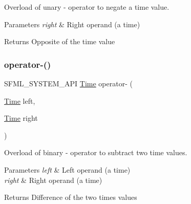 Overload of unary -\/ operator to negate a time value. 


\begin{DoxyParams}{Parameters}
{\em right} & Right operand (a time)\\
\hline
\end{DoxyParams}
\begin{DoxyReturn}{Returns}
Opposite of the time value \begin{DoxyVerb}\end{DoxyVerb}
 
\end{DoxyReturn}
\mbox{\label{classsf_1_1_time_ace92ab9bc7aec80239af7218cd89cc80}} 
\subsubsection{\texorpdfstring{operator-\/()}{operator-()}\hspace{0.1cm}{\footnotesize\ttfamily [2/2]}}
{\footnotesize\ttfamily S\+F\+M\+L\+\_\+\+S\+Y\+S\+T\+E\+M\+\_\+\+A\+PI \mbox{\hyperlink{classsf_1_1_time}{Time}} operator-\/ (\begin{DoxyParamCaption}\item[{\mbox{\hyperlink{classsf_1_1_time}{Time}}}]{left,  }\item[{\mbox{\hyperlink{classsf_1_1_time}{Time}}}]{right }\end{DoxyParamCaption})\hspace{0.3cm}{\ttfamily [related]}}



Overload of binary -\/ operator to subtract two time values. 


\begin{DoxyParams}{Parameters}
{\em left} & Left operand (a time) \\
\hline
{\em right} & Right operand (a time)\\
\hline
\end{DoxyParams}
\begin{DoxyReturn}{Returns}
Difference of the two times values \begin{DoxyVerb}\end{DoxyVerb}
 
\end{DoxyReturn}
\mbox{\label{classsf_1_1_time_aaf7888302cf4847f97cfc26875367b94}} 
